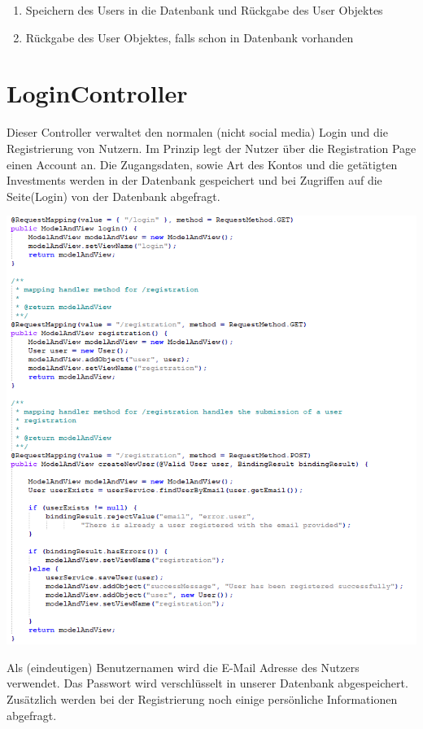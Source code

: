 \documentclass[12pt,a4paper]{article}
\begin{document}
\begin{enumerate}
	\item Speichern des Users in die Datenbank und Rückgabe des User Objektes
	\item     Rückgabe des User Objektes, falls schon in Datenbank vorhanden
\end{enumerate}



\section{LoginController} 
Dieser Controller verwaltet den normalen (nicht social media) Login und die Registrierung von Nutzern. Im Prinzip legt der Nutzer über die Registration Page einen Account an. Die Zugangsdaten, sowie Art des Kontos und die getätigten Investments werden in der Datenbank gespeichert und bei Zugriffen auf die Seite(Login) von der Datenbank abgefragt. 

\hspace{-5em} \includegraphics[width=1.2\textwidth]{./Graphics/bild5}

Als (eindeutigen) Benutzernamen wird die E-Mail Adresse des Nutzers verwendet. Das Passwort wird verschlüsselt in unserer Datenbank abgespeichert. Zusätzlich werden bei der Registrierung noch einige persönliche Informationen abgefragt.
\end{document}
